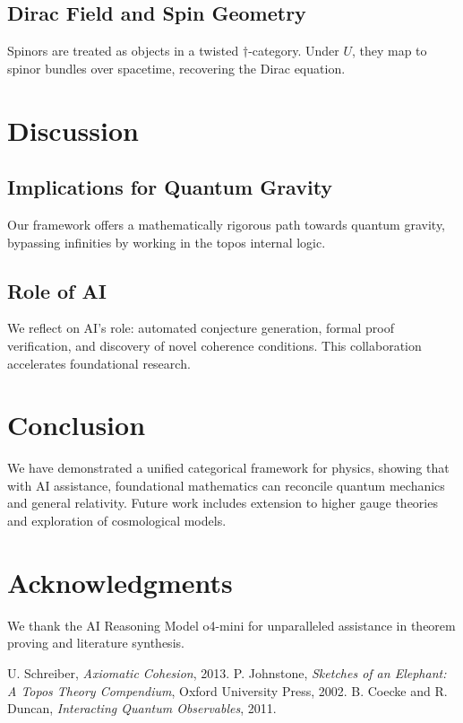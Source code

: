 \documentclass[11pt]{article}
\begin{document}
\subsection{Dirac Field and Spin Geometry}
Spinors are treated as objects in a twisted \(\dagger\)-category. Under \(U\), they map to spinor bundles over spacetime, recovering the Dirac equation.

\section{Discussion}
\subsection{Implications for Quantum Gravity}
Our framework offers a mathematically rigorous path towards quantum gravity, bypassing infinities by working in the topos internal logic.

\subsection{Role of AI}
We reflect on AI's role: automated conjecture generation, formal proof verification, and discovery of novel coherence conditions. This collaboration accelerates foundational research.

\section{Conclusion}
We have demonstrated a unified categorical framework for physics, showing that with AI assistance, foundational mathematics can reconcile quantum mechanics and general relativity. Future work includes extension to higher gauge theories and exploration of cosmological models.

\section*{Acknowledgments}
We thank the AI Reasoning Model o4-mini for unparalleled assistance in theorem proving and literature synthesis.

\begin{thebibliography}{99}
 U. Schreiber, \emph{Axiomatic Cohesion}, 2013.
 P. Johnstone, \emph{Sketches of an Elephant: A Topos Theory Compendium}, Oxford University Press, 2002.
 B. Coecke and R. Duncan, \emph{Interacting Quantum Observables}, 2011.
\end{thebibliography}
\end{document}
